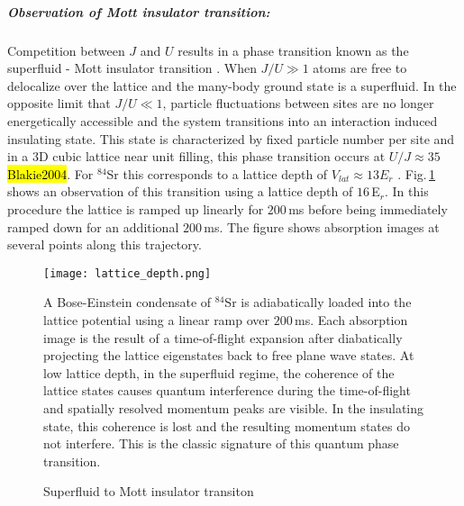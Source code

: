 \subparagraph{Observation of Mott insulator transition:}
Competition between $J$ and $U$ results in a phase transition known as the superfluid - Mott insulator transition \hl{\cite{Fisher1989,Greiner2002}}.
When $J/U \gg 1$ atoms are free to delocalize over the lattice and the many-body ground state is a superfluid.
In the opposite limit that $J/U \ll 1$, particle fluctuations between sites are no longer energetically accessible and the system transitions into an interaction induced insulating state.
This state is characterized by fixed particle number per site and in a 3D cubic lattice near unit filling, this phase transition occurs at $U/J \approx 35$ \hl{Blakie2004}.
For $^{84}$Sr this corresponds to a lattice depth of $V_{lat} \approx 13E_r$ \hl{\cite{Fisher1989}}.
Fig.\,\ref{fig:mottSFTransition} shows an observation of this transition using a lattice depth of $16$\,E$_r$.
In this procedure the lattice is ramped up linearly for $200\,$ms before being immediately ramped down for an additional $200\,$ms.
The figure shows absorption images at several points along this trajectory.
	\begin{figure} 
		\centerline{
		\texttt{[image: lattice\_depth.png]}}
		\caption{Superfluid to Mott insulator transiton}{A Bose-Einstein condensate of $^{84}$Sr is adiabatically loaded into the lattice potential using a linear ramp over $200$\,ms. Each absorption image is the result of a time-of-flight expansion after diabatically projecting the lattice eigenstates back to free plane wave states. At low lattice depth, in the superfluid regime, the coherence of the lattice states causes quantum interference during the time-of-flight and spatially resolved momentum peaks are visible. In the insulating state, this coherence is lost and the resulting momentum states do not interfere. This is the classic signature of this quantum phase transition.}
		\label{fig:mottSFTransition}
	\end{figure}

